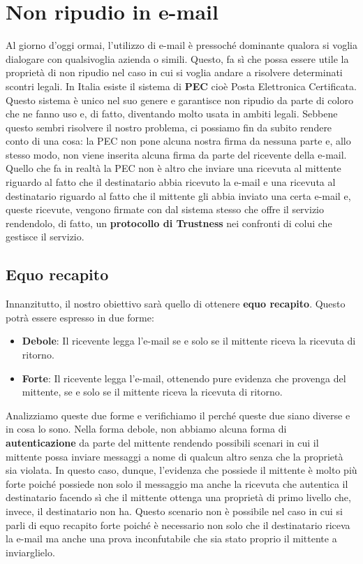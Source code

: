 \section{Non ripudio in e-mail}
Al giorno d'oggi ormai, l'utilizzo di e-mail è pressoché dominante qualora si voglia dialogare con qualsivoglia azienda o simili. Questo, fa sì che possa essere utile la proprietà di non ripudio nel caso in cui si voglia andare a risolvere determinati scontri legali. In Italia esiste il sistema di \textbf{PEC} cioè Posta Elettronica Certificata. Questo sistema è unico nel suo genere e garantisce non ripudio da parte di coloro che ne fanno uso e, di fatto, diventando molto usata in ambiti legali. Sebbene questo sembri risolvere il nostro problema, ci possiamo fin da subito rendere conto di una cosa: la PEC non pone alcuna nostra firma da nessuna parte e, allo stesso modo, non viene inserita alcuna firma da parte del ricevente della e-mail. Quello che fa in realtà la PEC non è altro che inviare una ricevuta al mittente riguardo al fatto che il destinatario abbia ricevuto la e-mail e una ricevuta al destinatario riguardo al fatto che il mittente gli abbia inviato una certa e-mail e, queste ricevute, vengono firmate con dal sistema stesso che offre il servizio rendendolo, di fatto, un \textbf{protocollo di Trustness} nei confronti di colui che gestisce il servizio.

\subsection{Equo recapito}
Innanzitutto, il nostro obiettivo sarà quello di ottenere \textbf{equo recapito}. Questo potrà essere espresso in due forme:
\begin{itemize}
    \item \textbf{Debole}: Il ricevente legga l'e-mail se e solo se il mittente riceva la ricevuta di ritorno.
    \item \textbf{Forte}: Il ricevente legga l'e-mail, ottenendo pure evidenza che provenga del mittente, se e solo se il mittente riceva la ricevuta di ritorno.
\end{itemize}
Analizziamo queste due forme e verifichiamo il perché queste due siano diverse e in cosa lo sono. 
Nella forma debole, non abbiamo alcuna forma di \textbf{autenticazione} da parte del mittente rendendo possibili scenari in cui il mittente possa inviare messaggi a nome di qualcun altro senza che la proprietà sia violata. In questo caso, dunque, l'evidenza che possiede il mittente è molto più forte poiché possiede non solo il messaggio ma anche la ricevuta che autentica il destinatario facendo sì che il mittente ottenga una proprietà di primo livello che, invece, il destinatario non ha.
Questo scenario non è possibile nel caso in cui si parli di equo recapito forte poiché è necessario non solo che il destinatario riceva la e-mail ma anche una prova inconfutabile che sia stato proprio il mittente a inviarglielo. 
